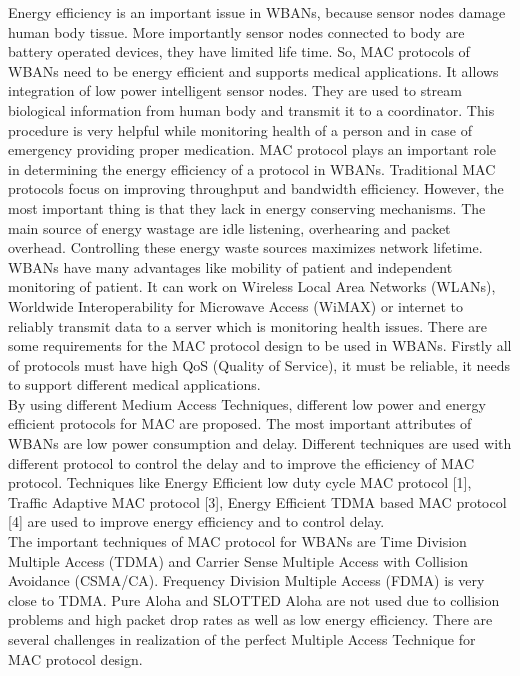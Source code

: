 \documentclass[10pt, conference, compsocconf]{IEEEtran}
\begin{document}
Energy efficiency is an important issue in WBANs, because sensor nodes damage human body tissue. More importantly sensor nodes connected to body are battery operated devices, they have limited life time. So, MAC protocols of WBANs need to be energy efficient and supports medical applications. It allows integration of low power intelligent sensor nodes. They are used to stream biological information from human body and transmit it to a coordinator. This procedure is very helpful while monitoring health of a person and in case of emergency providing proper medication. MAC protocol plays an important role in determining the energy efficiency of a protocol in WBANs. Traditional MAC protocols focus on improving throughput and bandwidth efficiency. However, the most important thing is that they lack in energy conserving mechanisms. The main source of energy wastage are idle listening, overhearing and packet overhead. Controlling these energy waste sources maximizes network lifetime.
\\
\indent WBANs have many advantages like mobility of patient and independent monitoring of patient. It can work on Wireless Local Area Networks (WLANs), Worldwide Interoperability for Microwave Access (WiMAX) or internet to reliably transmit data to a server which is monitoring health issues. There are some requirements for the MAC protocol design to be used in WBANs. Firstly all of protocols must have high QoS (Quality of Service), it must be reliable, it needs to support different medical applications.
\\
\indent By using different Medium Access Techniques, different low power and energy efficient protocols for MAC are proposed. The most important attributes of WBANs are low power consumption and delay. Different techniques are used with different protocol to control the delay and to improve the efficiency of MAC protocol. Techniques like Energy Efficient low duty cycle MAC protocol [1], Traffic Adaptive MAC protocol [3], Energy Efficient TDMA based MAC protocol [4] are used to improve energy efficiency and to control delay.
\\
\indent The important techniques of MAC protocol for WBANs are Time Division Multiple Access (TDMA) and Carrier Sense Multiple Access with Collision Avoidance (CSMA/CA). Frequency Division Multiple Access (FDMA) is very close to TDMA. Pure Aloha and SLOTTED Aloha are not used due to collision problems and high packet drop rates as well as low energy efficiency. There are several challenges in realization of the perfect Multiple Access Technique for MAC protocol design.
\end{document}

